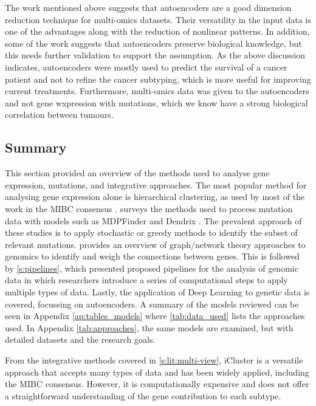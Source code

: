 
The work mentioned above suggests that autoencoders are a good dimension reduction technique for multi-omics datasets. Their versatility in the input data is one of the advantages along with the reduction of nonlinear patterns. In addition, some of the work suggests that autoencoders preserve biological knowledge, but this needs further validation to support the assumption. As the above discussion indicates, autoencoders were mostly used to predict the survival of a cancer patient and not to refine the cancer subtyping, which is more useful for improving current treatments. Furthermore, multi-omics data was given to the autoencoders and not gene wxpression with mutations, which we know have a strong biological correlation between tumours.

\subsection{Summary}

This section provided an overview of the methods used to analyse gene expression, mutations, and integrative approaches. The most popular method for analysing gene expression alone is hierarchical clustering, as used by most of the work in the MIBC consensus \citep{Kamoun2020-tj}.  surveys the methods used to process mutation data with models such as MDPFinder \citep{Zhao2012-wj} and Dendrix \citep{Vandin2012-cf}. The prevalent approach of these studies is to apply stochastic or greedy methods to identify the subset of relevant mutations.  provides an overview of graph/network theory approaches to genomics to identify and weigh the connections between genes. This is followed by \cref{s:pipelines}, which presented proposed pipelines for the analysis of genomic data in which researchers introduce a series of computational steps to apply multiple types of data. Lastly, the application of Deep Learning to genetic data is covered, focussing on autoencoders. A summary of the models reviewed can be seen in Appendix \cref{ap:tables_models} where \cref{tab:data_used} lists the approaches used. In Appendix \cref{tab:approaches}, the same models are examined, but with detailed datasets and the research goals.

From the integrative methods covered in \cref{s:lit:multi-view}, iCluster \citep{Shen2012-yj} is a versatile approach that accepts many types of data and has been widely applied, including the MIBC consensus. However, it is computationally expensive and does not offer a straightforward understanding of the gene contribution to each subtype.

